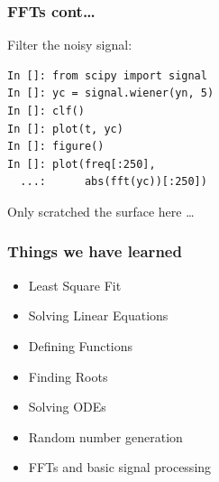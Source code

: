 \documentclass[14pt,compress]{beamer}
\begin{document}
\begin{frame}[fragile]
\frametitle{FFTs cont\dots}
Filter the noisy signal:
\begin{lstlisting}
In []: from scipy import signal
In []: yc = signal.wiener(yn, 5)
In []: clf()
In []: plot(t, yc)
In []: figure()
In []: plot(freq[:250], 
  ...:      abs(fft(yc))[:250])
\end{lstlisting}
Only scratched the surface here \dots
\end{frame}


\begin{frame}
  \frametitle{Things we have learned}
  \begin{itemize}
  \item Least Square Fit
  \item Solving Linear Equations
  \item Defining Functions
  \item Finding Roots
  \item Solving ODEs
  \item Random number generation
  \item FFTs and basic signal processing
  \end{itemize}
\end{frame}
\end{document}
